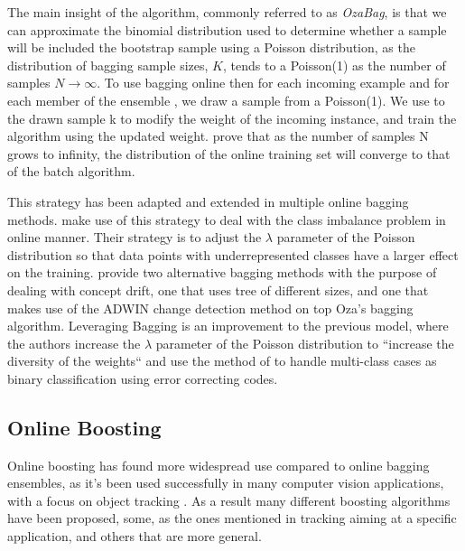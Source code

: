 The main insight of the algorithm, commonly referred to as \emph{OzaBag}, is that we can approximate the binomial distribution
used to determine whether a sample will be included the bootstrap
sample using a Poisson distribution, as the distribution of bagging sample sizes, $K$, tends
to a Poisson(1) as the number of samples $N \rightarrow \infty$. To use bagging online then
for each incoming example and
for each member of the ensemble \ensemble, we draw a sample from a Poisson(1). We use to the drawn sample k to modify the weight of the incoming instance, and train the algorithm using the updated weight. \citet{Oza2001online} prove that as the number of samples N grows
to infinity, the distribution of the online training set will converge to that of the batch algorithm.

This strategy has been adapted and extended in multiple online bagging methods. \citet{online-bag-imbalance}
make use of this strategy to deal with the class imbalance problem in online manner. Their strategy
is to adjust the $\lambda$ parameter of the Poisson distribution so that data points with underrepresented
classes have a larger effect on the training. \citet{new-ensemble-methods} provide two alternative
bagging methods with the purpose of dealing with concept drift, one that uses tree of different
sizes, and one that makes use of the ADWIN \cite{adwin} change detection method on top Oza's bagging algorithm. Leveraging Bagging \cite{leveraging-bagging} is an improvement to the previous model,
where the authors increase the $\lambda$ parameter of the Poisson distribution to ``increase the diversity of the weights`` and use the method of \citet{multiclass-codes} to handle multi-class cases
as binary classification using error correcting codes.

\subsection{Online Boosting}

Online boosting has found more widespread use compared to online bagging ensembles,
as it's been used successfully in many computer vision applications, with a focus on
object tracking \cite{online-boost-cv4, online-boost-cv, online-boost-cv3, online-boost-cv2, online-boost-cv5, online-boost-cv-6}.
As a result many different boosting algorithms have been proposed, some, as the ones
mentioned in tracking aiming at a specific application, and others that are more general.

